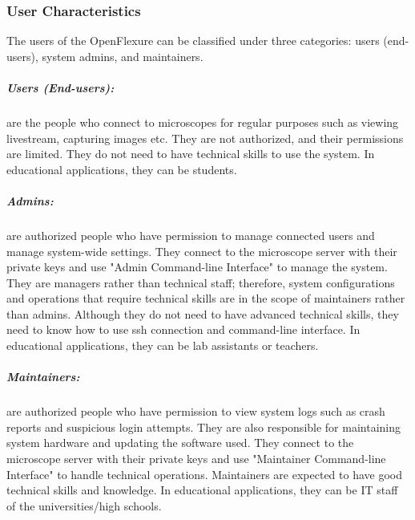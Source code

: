 \subsubsection{User Characteristics}
The users of the OpenFlexure can be classified under three categories: users (end-users), system admins, and maintainers.
\subparagraph{Users (End-users):} are the people who connect to microscopes for regular purposes such as viewing livestream, capturing images etc. They are not authorized, and their permissions are limited. They do not need to have technical skills to use the system. In educational applications, they can be students.
\subparagraph{Admins:} are authorized people who have permission to manage connected users and manage system-wide settings. They connect to the microscope server with their private keys and use "Admin Command-line Interface" to manage the system. They are managers rather than technical staff; therefore, system configurations and operations that require technical skills are in the scope of maintainers rather than admins. Although they do not need to have advanced technical skills, they need to know how to use ssh connection and command-line interface. In educational applications, they can be lab assistants or teachers.
\subparagraph{Maintainers:} are authorized people who have permission to view system logs such as crash reports and suspicious login attempts. They are also responsible for maintaining system hardware and updating the software used. They connect to the microscope server with their private keys and use "Maintainer Command-line Interface" to handle technical operations. Maintainers are expected to have good technical skills and knowledge. In educational applications, they can be IT staff of the universities/high schools.


